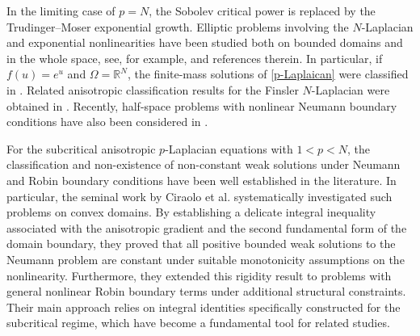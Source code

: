 \documentclass[10pt,a4paper]{amsart}
\numberwithin{equation}{section}
\newcommand{\R}{\mathbb{R}}
\begin{document}
In the limiting case of $p=N$, the Sobolev critical power is replaced by the Trudinger--Moser exponential growth. Elliptic problems involving the $N$-Laplacian and exponential nonlinearities have been studied both on bounded domains and in the whole space, see, for example, \cite{A1990, do1996, SS1999, LL2012, deF2022} and references therein. In particular, if $f(u) = e^u$ and $\Omega = \R^N$, the finite-mass solutions of \eqref{p-Laplaican} were classified in
\cite{E2018}. Related anisotropic classification results for the Finsler $N$-Laplacian were obtained in \cite{CL2024}. Recently, half-space problems with nonlinear Neumann boundary conditions have also been considered in \cite{DGHP2026}.

For the subcritical anisotropic $p$-Laplacian equations with $1<p<N$, the classification and non-existence of non-constant weak solutions under Neumann and Robin boundary conditions have been well established in the literature. In particular, the seminal work by Ciraolo et al. \cite{CCR2021} systematically investigated such problems on convex domains. By establishing a delicate integral inequality associated with the anisotropic gradient and the second fundamental form of the domain boundary, they proved that all positive bounded weak solutions to the Neumann problem are constant under suitable monotonicity assumptions on the nonlinearity. Furthermore, they extended this rigidity result to problems with general nonlinear Robin boundary terms under additional structural constraints. Their main approach relies on integral identities specifically constructed for the subcritical regime, which have become a fundamental tool for related studies.
\end{document}
